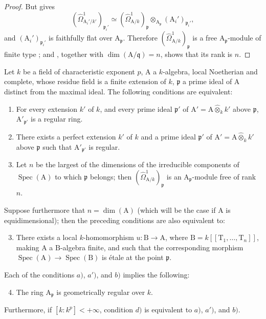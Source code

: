 \begin{proof}
But  gives
\[
  (\hat{\Omega}^1_{\mathrm{A}_i'/k'})_{\mathfrak p_i'}
  \simeq (\hat{\Omega}^1_{\mathrm{A}/k})_\mathfrak p
  \otimes_{\mathrm{A}_\mathfrak p}(\mathrm{A}_i')_{\mathfrak p_i'},
\]
and $(\mathrm{A}_i')_{\mathfrak p_i'}$ is faithfully flat over $\mathrm{A}_\mathfrak p$. Therefore $(\hat{\Omega}^1_{\mathrm{A}/k})_\mathfrak p$ is a free $\mathrm{A}_\mathfrak p$-module of finite type ; and , together with $\dim(\mathrm{A}/\mathfrak q)=n$, shows that its rank is $n$.
\end{proof}

\begin{theorem}[18.11.10]
\label{IV.18.11.10}
Let $k$ be a field of characteristic exponent $p$, $\mathrm{A}$ a $k$-algebra, local Noetherian and complete, whose residue field is a finite extension of $k$, $\mathfrak{p}$ a prime ideal of $\mathrm{A}$ distinct from the maximal ideal.
The following conditions are equivalent:
\begin{enumerate}[label=\alph*)]
  \item For every extension $k'$ of $k$, and every prime ideal $\mathfrak{p}'$ of $\mathrm{A}'=\mathrm{A}\widehat{\otimes}_kk'$ above $\mathfrak{p}$, $\mathrm{A}'_{\mathfrak{p}'}$ is a regular ring.
\item[a$'$)] There exists a perfect extension $k'$ of $k$ and a prime ideal $\mathfrak{p}'$ of $\mathrm{A}'=\mathrm{A}\widehat{\otimes}_kk'$ above $\mathfrak{p}$ such that $\mathrm{A}'_{\mathfrak{p}'}$ is regular.
  \item Let $n$ be the largest of the dimensions of the irreducible components of $\operatorname{Spec}(\mathrm{A})$ to which $\mathfrak{p}$ belongs; then $(\hat{\Omega}^1_{\mathrm{A}/k})_\mathfrak{p}$ is an $\mathrm{A}_\mathfrak{p}$-module free of rank $n$.
\end{enumerate}
Suppose furthermore that $n=\dim(\mathrm{A})$ (which will be the case if $\mathrm{A}$ is equidimensional); then the preceding conditions are also equivalent to:
\begin{enumerate}[label=\alph*)]
  \setcounter{enumi}{2}
  \item There exists a local $k$-homomorphism $u:\mathrm{B}\to\mathrm{A}$, where $\mathrm{B}=k[[\mathrm{T}_1,\ldots,\mathrm{T}_n]]$, making $\mathrm{A}$ a $\mathrm{B}$-algebra finite, and such that the corresponding morphism $\operatorname{Spec}(\mathrm{A})\to\operatorname{Spec}(\mathrm{B})$ is \'etale at the point $\mathfrak{p}$.
\end{enumerate}
Each of the conditions $a)$, $a')$, and $b)$ implies the following:
\begin{enumerate}[label=\alph*)]
  \setcounter{enumi}{3}
  \item The ring $\mathrm{A}_\mathfrak{p}$ is geometrically regular over $k$.
\end{enumerate}
Furthermore, if $[k:k^p]<+\infty$, condition $d)$ is equivalent to $a)$, $a')$, and $b)$.
\end{theorem}

